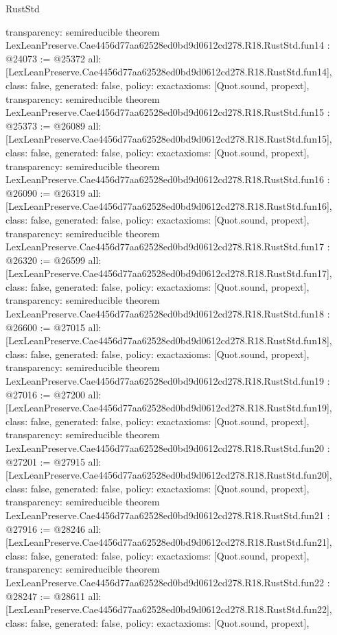 \begin{lexlean}{RustStd}
\begin{coremodule}
{  transparency: semireducible
}
theorem LexLeanPreserve.Cae4456d77aa62528ed0bd9d0612cd278.R18.RustStd.fun14 : @24073 := @25372 {
  all: [LexLeanPreserve.Cae4456d77aa62528ed0bd9d0612cd278.R18.RustStd.fun14],
  class: false,
  generated: false,
  policy: exact{axioms: [Quot.sound, propext]},
  transparency: semireducible
}
theorem LexLeanPreserve.Cae4456d77aa62528ed0bd9d0612cd278.R18.RustStd.fun15 : @25373 := @26089 {
  all: [LexLeanPreserve.Cae4456d77aa62528ed0bd9d0612cd278.R18.RustStd.fun15],
  class: false,
  generated: false,
  policy: exact{axioms: [Quot.sound, propext]},
  transparency: semireducible
}
theorem LexLeanPreserve.Cae4456d77aa62528ed0bd9d0612cd278.R18.RustStd.fun16 : @26090 := @26319 {
  all: [LexLeanPreserve.Cae4456d77aa62528ed0bd9d0612cd278.R18.RustStd.fun16],
  class: false,
  generated: false,
  policy: exact{axioms: [Quot.sound, propext]},
  transparency: semireducible
}
theorem LexLeanPreserve.Cae4456d77aa62528ed0bd9d0612cd278.R18.RustStd.fun17 : @26320 := @26599 {
  all: [LexLeanPreserve.Cae4456d77aa62528ed0bd9d0612cd278.R18.RustStd.fun17],
  class: false,
  generated: false,
  policy: exact{axioms: [Quot.sound, propext]},
  transparency: semireducible
}
theorem LexLeanPreserve.Cae4456d77aa62528ed0bd9d0612cd278.R18.RustStd.fun18 : @26600 := @27015 {
  all: [LexLeanPreserve.Cae4456d77aa62528ed0bd9d0612cd278.R18.RustStd.fun18],
  class: false,
  generated: false,
  policy: exact{axioms: [Quot.sound, propext]},
  transparency: semireducible
}
theorem LexLeanPreserve.Cae4456d77aa62528ed0bd9d0612cd278.R18.RustStd.fun19 : @27016 := @27200 {
  all: [LexLeanPreserve.Cae4456d77aa62528ed0bd9d0612cd278.R18.RustStd.fun19],
  class: false,
  generated: false,
  policy: exact{axioms: [Quot.sound, propext]},
  transparency: semireducible
}
theorem LexLeanPreserve.Cae4456d77aa62528ed0bd9d0612cd278.R18.RustStd.fun20 : @27201 := @27915 {
  all: [LexLeanPreserve.Cae4456d77aa62528ed0bd9d0612cd278.R18.RustStd.fun20],
  class: false,
  generated: false,
  policy: exact{axioms: [Quot.sound, propext]},
  transparency: semireducible
}
theorem LexLeanPreserve.Cae4456d77aa62528ed0bd9d0612cd278.R18.RustStd.fun21 : @27916 := @28246 {
  all: [LexLeanPreserve.Cae4456d77aa62528ed0bd9d0612cd278.R18.RustStd.fun21],
  class: false,
  generated: false,
  policy: exact{axioms: [Quot.sound, propext]},
  transparency: semireducible
}
theorem LexLeanPreserve.Cae4456d77aa62528ed0bd9d0612cd278.R18.RustStd.fun22 : @28247 := @28611 {
  all: [LexLeanPreserve.Cae4456d77aa62528ed0bd9d0612cd278.R18.RustStd.fun22],
  class: false,
  generated: false,
  policy: exact{axioms: [Quot.sound, propext]},
}
\end{coremodule}
\end{lexlean}
